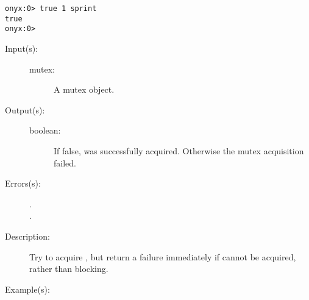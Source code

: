 \begin{description}
\begin{description}
\begin{verbatim}
onyx:0> true 1 sprint
true
onyx:0>
		\end{verbatim}
	\end{description}
\label{systemdict:trylock}
\item[{\onyxop{mutex}{trylock}{boolean}}: ]
	\begin{description}\item[]
	\item[Input(s): ]
		\begin{description}\item[]
		\item[mutex: ]
			A mutex object.
		\end{description}
	\item[Output(s): ]
		\begin{description}\item[]
		\item[boolean: ]
			If false,  was successfully acquired.
			Otherwise the mutex acquisition failed.
		\end{description}
	\item[Errors(s): ]
		\begin{description}\item[]
		\item[.]
		\item[.]
		\end{description}
	\item[Description: ]
		Try to acquire , but return a failure immediately
		if  cannot be acquired, rather than blocking.
	\item[Example(s): ]\begin{verbatim}


\end{verbatim}
\end{description}
\end{description}
